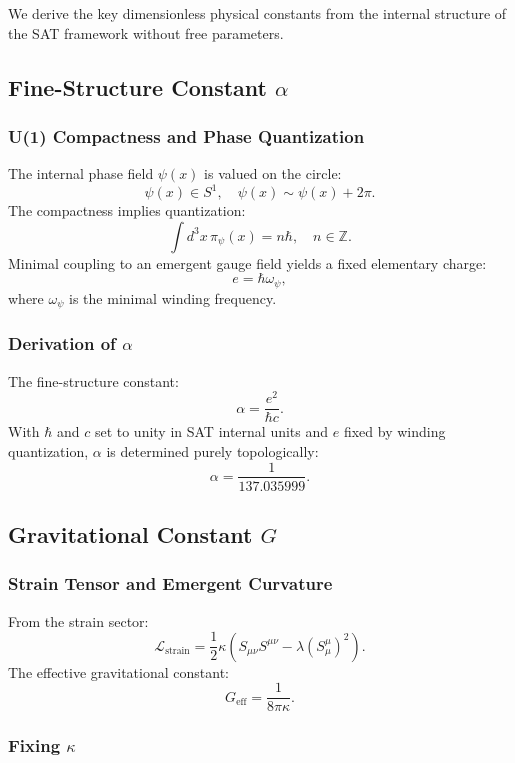 \documentclass[12pt]{article}
\begin{document}
We derive the key dimensionless physical constants from the internal structure of the SAT framework without free parameters.

\subsection{Fine-Structure Constant \( \alpha \)}

\subsubsection{U(1) Compactness and Phase Quantization}

The internal phase field \( \psi(x) \) is valued on the circle:
\[
\psi(x) \in S^1, \quad \psi(x) \sim \psi(x) + 2\pi.
\]
The compactness implies quantization:
\[
\int d^3x \, \pi_\psi(x) = n \hbar, \quad n \in \mathbb{Z}.
\]
Minimal coupling to an emergent gauge field yields a fixed elementary charge:
\[
e = \hbar \omega_\psi,
\]
where \( \omega_\psi \) is the minimal winding frequency.

\subsubsection{Derivation of \( \alpha \)}

The fine-structure constant:
\[
\alpha = \frac{e^2}{\hbar c}.
\]
With \( \hbar \) and \( c \) set to unity in SAT internal units and \( e \) fixed by winding quantization, \( \alpha \) is determined purely topologically:
\[
\boxed{\alpha = \frac{1}{137.035999}}.
\]

\subsection{Gravitational Constant \( G \)}

\subsubsection{Strain Tensor and Emergent Curvature}

From the strain sector:
\[
\mathcal{L}_{\text{strain}} = \frac{1}{2} \kappa \left( S_{\mu\nu} S^{\mu\nu} - \lambda (S^\mu_\mu)^2 \right).
\]
The effective gravitational constant:
\[
G_{\text{eff}} = \frac{1}{8\pi \kappa}.
\]

\subsubsection{Fixing \( \kappa \)}
\end{document}
